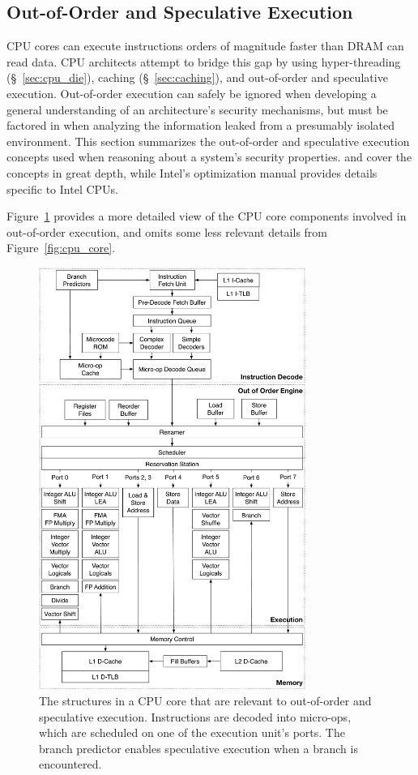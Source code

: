 \subsection{Out-of-Order and Speculative Execution}
\label{sec:out_of_order}

CPU cores can execute instructions orders of magnitude faster than DRAM can
read data. CPU architects attempt to bridge this gap by using hyper-threading
(\S~\ref{sec:cpu_die}), caching (\S~\ref{sec:caching}), and out-of-order and
speculative execution. Out-of-order execution can safely be ignored when
developing a general understanding of an architecture's security mechanisms,
but must be factored in when analyzing the information leaked from a presumably
isolated environment. This section summarizes the out-of-order and speculative
execution concepts used when reasoning about a system's security properties.
\cite{patterson2013architecture} and \cite{hennessy2012architecture} cover the
concepts in great depth, while Intel's optimization manual
\cite{intel2014optimization} provides details specific to Intel CPUs.


Figure~\ref{fig:cpu_out_of_order} provides a more detailed view of the CPU core
components involved in out-of-order execution, and omits some less relevant
details from Figure~\ref{fig:cpu_core}.

\begin{figure}[hbt]
  \centering
  \includegraphics[width=87mm]{figures/cpu_out_of_order.pdf}
  \caption{
    The structures in a CPU core that are relevant to out-of-order and
    speculative execution. Instructions are decoded into micro-ops, which are
    scheduled on one of the execution unit's ports. The branch predictor
    enables speculative execution when a branch is encountered.
  }
  \label{fig:cpu_out_of_order}
\end{figure}

